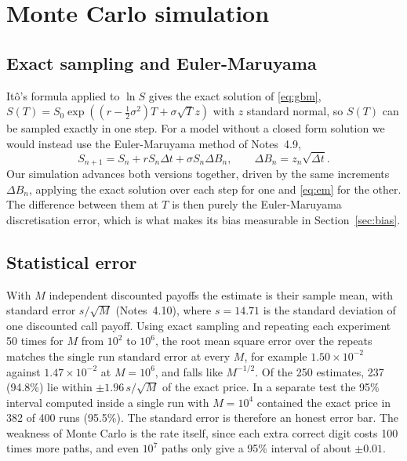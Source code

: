 \documentclass[11pt,a4paper]{article}
\begin{document}
\section{Monte Carlo simulation}\label{sec:mc}

\subsection{Exact sampling and Euler-Maruyama}

It\^o's formula applied to $\ln S$ gives the exact solution of \eqref{eq:gbm}, $S(T) = S_0\exp((r - \frac{1}{2}\sigma^2)T + \sigma\sqrt{T}z)$ with $z$ standard normal, so $S(T)$ can be sampled exactly in one step. For a model without a closed form solution we would instead use the Euler-Maruyama method of Notes~4.9,
\begin{equation}
S_{n+1} = S_n + rS_n\Delta t + \sigma S_n\Delta B_n, \qquad \Delta B_n = z_n\sqrt{\Delta t}. \label{eq:em}
\end{equation}
Our simulation advances both versions together, driven by the same increments $\Delta B_n$, applying the exact solution over each step for one and \eqref{eq:em} for the other. The difference between them at $T$ is then purely the Euler-Maruyama discretisation error, which is what makes its bias measurable in Section~\ref{sec:bias}.

\subsection{Statistical error}

With $M$ independent discounted payoffs the estimate is their sample mean, with standard error $s/\sqrt{M}$ (Notes~4.10), where $s = 14.71$ is the standard deviation of one discounted call payoff. Using exact sampling and repeating each experiment 50 times for $M$ from $10^2$ to $10^6$, the root mean square error over the repeats matches the single run standard error at every $M$, for example $1.50\times10^{-2}$ against $1.47\times10^{-2}$ at $M = 10^6$, and falls like $M^{-1/2}$. Of the 250 estimates, 237 (94.8\%) lie within $\pm1.96\,s/\sqrt{M}$ of the exact price. In a separate test the 95\% interval computed inside a single run with $M = 10^4$ contained the exact price in 382 of 400 runs (95.5\%). The standard error is therefore an honest error bar. The weakness of Monte Carlo is the rate itself, since each extra correct digit costs 100 times more paths, and even $10^7$ paths only give a 95\% interval of about $\pm0.01$.
\end{document}
